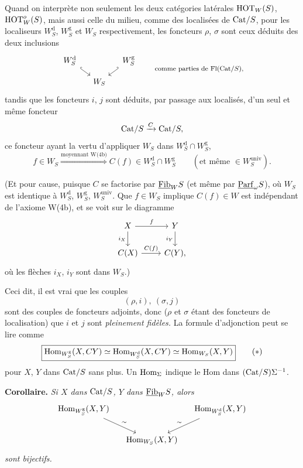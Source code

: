 \noindent{}
Quand on interprète non seulement les deux catégories latérales $\mathrm{HOT}_W(S)$, $\mathrm{HOT}^{o}_W(S)$, mais aussi celle du milieu, comme des localisées de $\mathrm{Cat}/S$, pour les localiseurs $W^{\mathrm{d}}_S$, $W^{\mathrm{g}}_S$ et $W_S$ respectivement, les foncteurs $\rho$, $\sigma$ sont ceux déduits des deux inclusions
\[
\begin{tikzcd}[column sep=small, row sep=small]
W^{\mathrm{d}}_S \arrow[dr, hook] & & W^{\mathrm{g}}_S \arrow[dl, hook'] \\
 & W_S &
\end{tikzcd}
\qquad \text{\footnotesize comme parties de Fl(Cat/$S$),}
\]
tandis que les foncteurs $i$, $j$ sont déduits, par passage aux localisés, d’un seul et même foncteur
\[
\mathrm{Cat}/S \xrightarrow{C} \mathrm{Cat}/S,
\]
ce foncteur ayant la vertu d’appliquer $W_S$ dans $W^{\mathrm{d}}_S \cap W^{\mathrm{g}}_S$,
\[
f \in W_S \overset{\text{moyennant W(4b)}}{\Longrightarrow} C(f) \in W^{\mathrm{d}}_S \cap W^{\mathrm{g}}_S \qquad (\text{et même } \in W^{\mathrm{univ}}_S).
\]

(Et pour cause, puisque $C$ se factorise par $\underline{\mathrm{Fib}}_W S$ (et même par $\underline{\mathrm{Parf}}_\omega S$), où $W_S$ est identique à $W^{\mathrm{d}}_S$, $W^{\mathrm{g}}_S$, $W^{\mathrm{univ}}_S$. Que $f \in W_S$ implique $C(f) \in W$ est indépendant de l’axiome W(4b), et se voit sur le diagramme
\[
\begin{tikzcd}
X \arrow[r, "f"] \arrow[d, "i_X"'] & Y \arrow[d, "i_Y"'] \\
C(X) \arrow[r, "C(f)"] & C(Y),
\end{tikzcd}
\]
où les flèches $i_X$, $i_Y$ sont dans $W_S$.)

Ceci dit, il est vrai que les couples
\[
(\rho, i),\ (\sigma, j)
\]
sont des couples de foncteurs adjoints, donc ($\rho$ et $\sigma$ étant des foncteurs de localisation) que $i$ et $j$ sont \textit{pleinement fidèles.} La formule d’adjonction peut se lire comme
\[
\boxed{\mathrm{Hom}_{W^{\mathrm{g}}_S}(X, CY) \simeq \mathrm{Hom}_{W^{\mathrm{d}}_S}(X, CY) \simeq \mathrm{Hom}_{W_S}(X, Y)}
\tag*{$(\ast)$}
\]
pour $X$, $Y$ dans $\mathrm{Cat}/S$ sans plus. Un $\mathrm{Hom}_\Sigma$ indique le Hom dans $(\mathrm{Cat}/S)\Sigma^{-1}$.

\noindent\textbf{Corollaire.} \textit{Si $X$ dans} $\mathrm{Cat}/S$\textit{, $Y$ dans} $\underline{\mathrm{Fib}}_W S$\textit{, alors}
\[
\begin{tikzcd}[column sep=small]
\Hom_{W^{\mathrm{g}}_S}(X, Y) \arrow[dr, "\sim"] & & \Hom_{W^{\mathrm{d}}_S}(X, Y) \arrow[dl, "\sim"'] \\
 & \Hom_{W_S}(X, Y) &
\end{tikzcd}
\]
\textit{sont bijectifs.}

